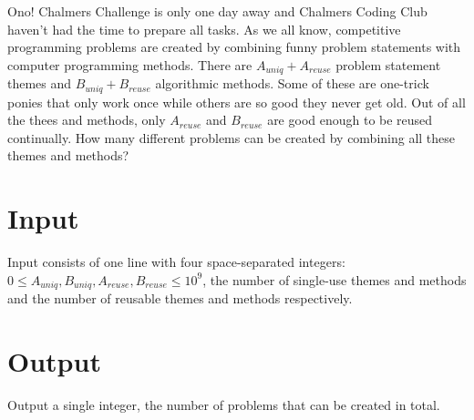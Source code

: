 Ono! Chalmers Challenge is only one day away and Chalmers Coding Club haven’t
had the time to prepare all tasks. As we all know, competitive programming
problems are created by combining funny problem statements with computer
programming methods. There are $A_{uniq}+A_{reuse}$ problem statement themes and
$B_{uniq}+B_{reuse}$ algorithmic methods. Some of these are one-trick ponies
that only work once while others are so good they never get old. Out of all the
thees and methods, only $A_{reuse}$ and $B_{reuse}$ are good enough to be reused
continually. How many different problems can be created by combining all these
themes and methods?

\section*{Input}
Input consists of one line with four space-separated integers: $0 \le A_{uniq},
B_{uniq}, A_{reuse}, B_{reuse} \le 10^9$, the number of single-use themes and
methods and the number of reusable themes and methods respectively.

\section*{Output}
Output a single integer, the number of problems that can be created in total.
